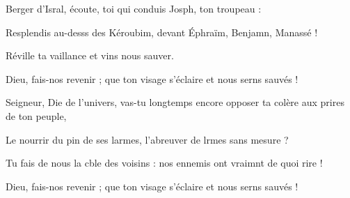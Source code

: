 \item Berger d’Isral, écoute,\psstar{} toi qui conduis Josph, ton troupeau : 
\item Resplendis au-desss des Kéroubim,\psstar{} devant Éphraïm, Benjamn, Manassé ! 
\item Réville ta vaillance\psstar{} et vins nous sauver.
\item Dieu, fais-nos revenir ;\psstar{} que ton visage s’éclaire et nous serns sauvés !
\item Seigneur, Die de l’univers,\psstar{} vas-tu longtemps encore opposer ta colère aux prires de ton peuple,
\item Le nourrir du pin de ses larmes,\psstar{} l’abreuver de lrmes sans mesure ?
\item Tu fais de nous la cble des voisins :\psstar{} nos ennemis ont vraimnt de quoi rire !
\item Dieu, fais-nos revenir ;\psstar{} que ton visage s’éclaire et nous serns sauvés !